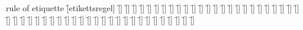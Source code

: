 \begin{questions}
\begin{multicols}{2}
        \question rule of etiquette \f[etikettsregel]
        \question  \f[]
        \question  \f[]
        \question  \f[]
        \question  \f[]
        \question  \f[]
        \question  \f[]
        \question  \f[]
        \question  \f[]
        \question  \f[]
        \question  \f[]
        \question  \f[]
        \question  \f[]
        \question  \f[]
        \question  \f[]
        \question  \f[]
        \question  \f[]
        \question  \f[]
        \question  \f[]
        \question  \f[]
        \question  \f[]
        \question  \f[]
        \question  \f[]
        \question  \f[]
        \question  \f[]
        \question  \f[]
        \question  \f[]
        \question  \f[]
        \question  \f[]
        \question  \f[]
        \question  \f[]
        \question  \f[]
        \question  \f[]
        \question  \f[]
        \question  \f[]
        \question  \f[]
        \question  \f[]
        \question  \f[]
        \question  \f[]
        \question  \f[]
        \question  \f[]
        \question  \f[]
        \question  \f[]
        \question  \f[]
        \question  \f[]
        \question  \f[]
        \question  \f[]
        \question  \f[]
        \question  \f[]
        \question  \f[]
        \question  \f[]
        \question  \f[]
    \end{multicols}
\end{questions}
